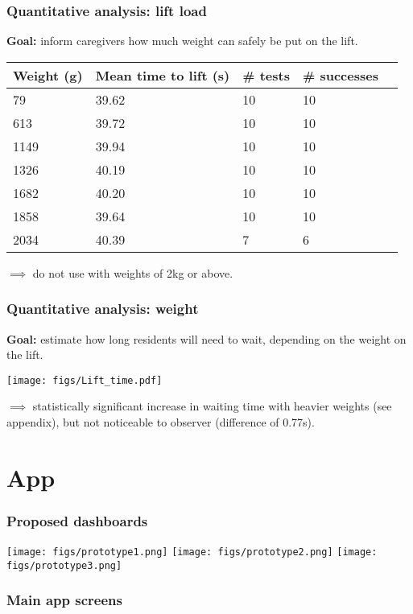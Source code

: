 \documentclass{beamer}
\begin{document}
\begin{frame}
  \frametitle{Quantitative analysis: lift load}
  {\bf Goal: } inform caregivers how much weight can safely be put on the lift.
  \begin{center}
    \begin{tabular}{llllr}
      {\bf Weight (g)} & {\bf Mean time to lift (s)} & {\bf \# tests} & {\bf \# successes}\\
      \hline
      79 & 39.62  & 10 & 10  \\
      613 & 39.72 & 10 & 10 \\
      1149 & 39.94 & 10 & 10  \\
      1326 & 40.19 & 10 & 10 \\
      1682 & 40.20 & 10 & 10 \\
      1858 & 39.64 & 10 & 10  \\
      2034 & 40.39 & 7 & 6
    \end{tabular}
  \end{center}
  $\implies$ do not use with weights of 2kg or above. 
\end{frame}

\begin{frame}
  \frametitle{Quantitative analysis: weight}
  {\bf Goal: } estimate how long residents will need to wait, depending on the weight on the lift.
  \begin{center}
    \texttt{[image: figs/Lift\_time.pdf]}
  \end{center}
  $\implies$ statistically significant increase in waiting time with heavier weights (see appendix), but not noticeable to observer (difference of 0.77s).
\end{frame}

\section{App}
\begin{frame}
  \frametitle{Proposed dashboards}
  \begin{center}
    \texttt{[image: figs/prototype1.png]}
    \texttt{[image: figs/prototype2.png]}
    \texttt{[image: figs/prototype3.png]}
  \end{center}
\end{frame}

\begin{frame}
  \frametitle{Main app screens}
\end{frame}
\end{document}
